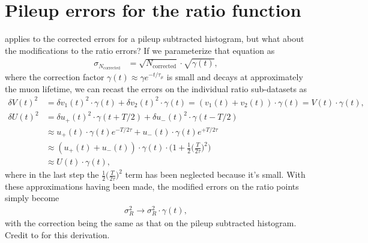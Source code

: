 \section{Pileup errors for the ratio function}

 applies to the corrected errors for a pileup subtracted histogram, but what about the modifications to the ratio errors? If we parameterize that equation as 
 	\begin{align}
 		\sigma_{N_{\text{corrected}}} &= \sqrt{N_{\text{corrected}}} \cdot \sqrt{\gamma(t)},
	\end{align}
where the correction factor $\gamma(t) \approx \gamma e^{-t/\tau_{\mu}}$ is small and decays at approximately the muon lifetime, we can recast the errors on the individual ratio sub-datasets as
	\begin{equation}	
	\begin{aligned}
  		\delta V(t)^{2} &= \delta v_{1}(t)^{2}\cdot \gamma(t) + \delta v_{2}(t)^{2} \cdot \gamma(t) = (v_{1}(t) + v_{2}(t)) \cdot \gamma(t) = V(t) \cdot \gamma(t), \\
   		\delta U(t)^{2} &= \delta u_{+}(t)^{2}\cdot \gamma(t+T/2) + \delta u_{-}(t)^{2} \cdot \gamma(t-T/2) \\
   						&\approx u_{+}(t) \cdot \gamma(t)e^{-T/2\tau} + u_{-}(t) \cdot \gamma(t)e^{+T/2\tau} \\
   						&\approx (u_{+}(t) + u_{-}(t)) \cdot \gamma(t) \cdot \Big(1 + \frac{1}{2}\Big(\frac{T}{2\tau}\Big)^{2}\Big) \\
   						&\approx  U(t) \cdot \gamma(t),
	\end{aligned}
	\end{equation}
where in the last step the $\frac{1}{2}\Big(\frac{T}{2\tau}\Big)^{2}$ term has been neglected because it's small. With these approximations having been made, the modified errors on the ratio points simply become
 	\begin{align}
 		\sigma_{R}^{2} \rightarrow \sigma_{R}^{2} \cdot \gamma(t), 
	\end{align}
with the correction being the same as that on the pileup subtracted histogram. Credit to  for this derivation.

